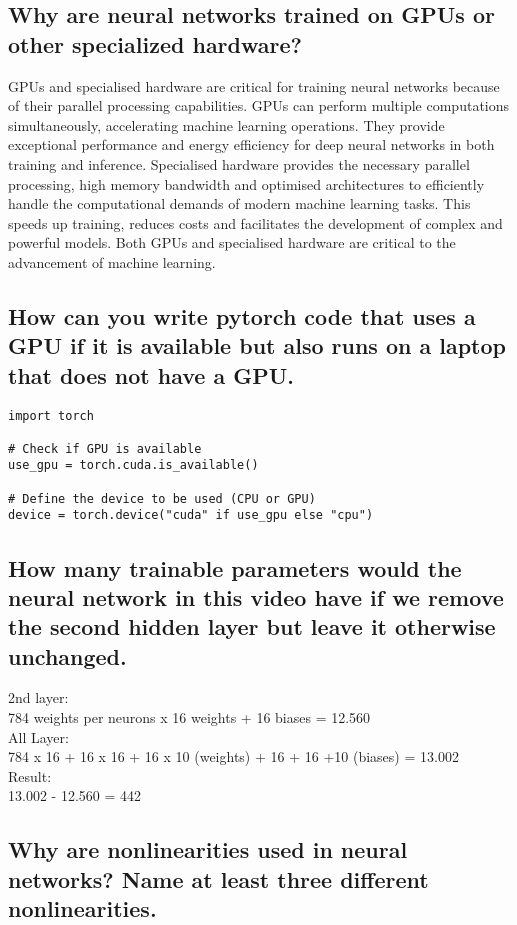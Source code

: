 \documentclass{article}
\begin{document}
\subsection{Why are neural networks trained on GPUs or other specialized hardware?}

GPUs and specialised hardware are critical for training neural networks because of their parallel processing capabilities.
GPUs can perform multiple computations simultaneously, accelerating machine learning operations.
They provide exceptional performance and energy efficiency for deep neural networks in both training and inference.
Specialised hardware provides the necessary parallel processing, high memory bandwidth and optimised architectures to efficiently handle the computational demands of modern machine learning tasks.
This speeds up training, reduces costs and facilitates the development of complex and powerful models.
Both GPUs and specialised hardware are critical to the advancement of machine learning.


\subsection{How can you write pytorch code that uses a GPU if it is available but also runs on a laptop that does not have a GPU.}

\begin{lstlisting}
import torch

# Check if GPU is available
use_gpu = torch.cuda.is_available()

# Define the device to be used (CPU or GPU)
device = torch.device("cuda" if use_gpu else "cpu")
\end{lstlisting}


\subsection{How many trainable parameters would the neural network in this video have if we remove the second hidden layer but leave it otherwise unchanged.}

2nd layer:\\784 weights per neurons x 16 weights + 16 biases = 12.560 \\
All Layer:\\784 x 16 + 16  x 16 + 16 x 10 (weights) + 16 + 16 +10 (biases) = 13.002 \\
Result:\\
13.002 - 12.560 = 442


\subsection{Why are nonlinearities used in neural networks? Name at least three different nonlinearities.}
\end{document}
